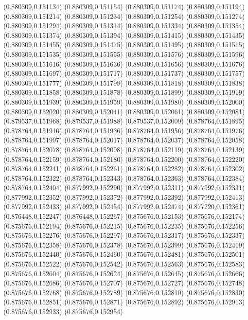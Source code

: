 (0.880309,0.151134)
(0.880309,0.151154)
(0.880309,0.151174)
(0.880309,0.151194)
(0.880309,0.151214)
(0.880309,0.151234)
(0.880309,0.151254)
(0.880309,0.151274)
(0.880309,0.151294)
(0.880309,0.151314)
(0.880309,0.151334)
(0.880309,0.151354)
(0.880309,0.151374)
(0.880309,0.151394)
(0.880309,0.151415)
(0.880309,0.151435)
(0.880309,0.151455)
(0.880309,0.151475)
(0.880309,0.151495)
(0.880309,0.151515)
(0.880309,0.151535)
(0.880309,0.151555)
(0.880309,0.151576)
(0.880309,0.151596)
(0.880309,0.151616)
(0.880309,0.151636)
(0.880309,0.151656)
(0.880309,0.151676)
(0.880309,0.151697)
(0.880309,0.151717)
(0.880309,0.151737)
(0.880309,0.151757)
(0.880309,0.151777)
(0.880309,0.151798)
(0.880309,0.151818)
(0.880309,0.151838)
(0.880309,0.151858)
(0.880309,0.151878)
(0.880309,0.151899)
(0.880309,0.151919)
(0.880309,0.151939)
(0.880309,0.151959)
(0.880309,0.151980)
(0.880309,0.152000)
(0.880309,0.152020)
(0.880309,0.152041)
(0.880309,0.152061)
(0.880309,0.152081)
(0.879537,0.151968)
(0.879537,0.151988)
(0.879537,0.152009)
(0.878764,0.151895)
(0.878764,0.151916)
(0.878764,0.151936)
(0.878764,0.151956)
(0.878764,0.151976)
(0.878764,0.151997)
(0.878764,0.152017)
(0.878764,0.152037)
(0.878764,0.152058)
(0.878764,0.152078)
(0.878764,0.152098)
(0.878764,0.152119)
(0.878764,0.152139)
(0.878764,0.152159)
(0.878764,0.152180)
(0.878764,0.152200)
(0.878764,0.152220)
(0.878764,0.152241)
(0.878764,0.152261)
(0.878764,0.152282)
(0.878764,0.152302)
(0.878764,0.152322)
(0.878764,0.152343)
(0.878764,0.152363)
(0.878764,0.152384)
(0.878764,0.152404)
(0.877992,0.152290)
(0.877992,0.152311)
(0.877992,0.152331)
(0.877992,0.152352)
(0.877992,0.152372)
(0.877992,0.152392)
(0.877992,0.152413)
(0.877992,0.152433)
(0.877992,0.152454)
(0.877992,0.152474)
(0.877220,0.152361)
(0.876448,0.152247)
(0.876448,0.152267)
(0.875676,0.152153)
(0.875676,0.152174)
(0.875676,0.152194)
(0.875676,0.152215)
(0.875676,0.152235)
(0.875676,0.152256)
(0.875676,0.152276)
(0.875676,0.152297)
(0.875676,0.152317)
(0.875676,0.152337)
(0.875676,0.152358)
(0.875676,0.152378)
(0.875676,0.152399)
(0.875676,0.152419)
(0.875676,0.152440)
(0.875676,0.152460)
(0.875676,0.152481)
(0.875676,0.152501)
(0.875676,0.152522)
(0.875676,0.152542)
(0.875676,0.152563)
(0.875676,0.152583)
(0.875676,0.152604)
(0.875676,0.152624)
(0.875676,0.152645)
(0.875676,0.152666)
(0.875676,0.152686)
(0.875676,0.152707)
(0.875676,0.152727)
(0.875676,0.152748)
(0.875676,0.152768)
(0.875676,0.152789)
(0.875676,0.152810)
(0.875676,0.152830)
(0.875676,0.152851)
(0.875676,0.152871)
(0.875676,0.152892)
(0.875676,0.152913)
(0.875676,0.152933)
(0.875676,0.152954)
